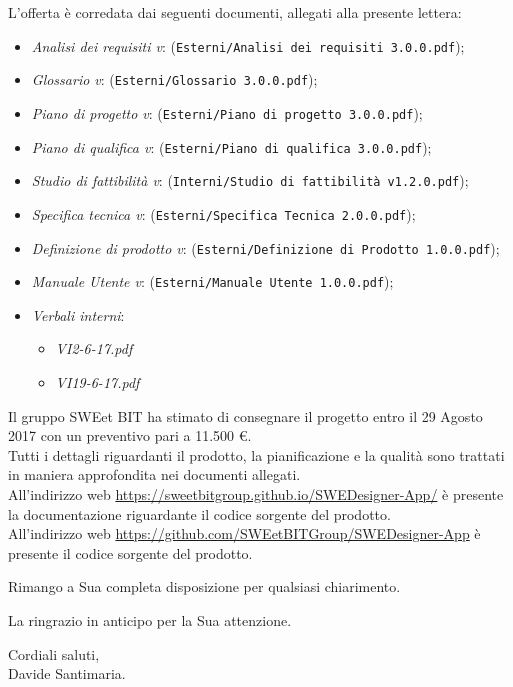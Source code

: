 	L'offerta è corredata dai seguenti documenti, allegati alla presente lettera:
	\begin{itemize}
		\item \emph{Analisi dei requisiti v\VersioneAR{}}: (\verb|Esterni/Analisi dei requisiti 3.0.0.pdf|);
		\item \emph{Glossario v\VersioneG{}}: (\verb|Esterni/Glossario 3.0.0.pdf|);
		\item \emph{Piano di progetto v\VersionePP{}}: (\verb|Esterni/Piano di progetto 3.0.0.pdf|);
		\item \emph{Piano di qualifica v\VersionePQ{}}: (\verb|Esterni/Piano di qualifica 3.0.0.pdf|);
		\item \emph{Studio di fattibilità v\VersioneSF{}}: (\verb|Interni/Studio di fattibilità v1.2.0.pdf|);
		\item \emph{Specifica tecnica v\VersioneST{}}: (\verb|Esterni/Specifica Tecnica 2.0.0.pdf|);
		\item \emph{Definizione di prodotto v\VersioneDP{}}: (\verb|Esterni/Definizione di Prodotto 1.0.0.pdf|);
		\item \emph{Manuale Utente v\VersioneMU{}}: (\verb|Esterni/Manuale Utente 1.0.0.pdf|);
		\item \emph{Verbali interni}:
		\begin{itemize}
			\item \emph{VI2-6-17.pdf}
			\item \emph{VI19-6-17.pdf}
		\end{itemize}
	\end{itemize}
	Il gruppo SWEet BIT ha stimato di consegnare il progetto entro il 29 Agosto 2017
	con un preventivo pari a 11.500 \euro .\\
	Tutti i dettagli riguardanti il prodotto, la pianificazione e la qualità sono trattati in maniera approfondita
	nei documenti allegati.\\
	All'indirizzo web \url{https://sweetbitgroup.github.io/SWEDesigner-App/} è presente la documentazione riguardante il codice sorgente del prodotto.\\
	All'indirizzo web \url{https://github.com/SWEetBITGroup/SWEDesigner-App} è presente il codice sorgente del prodotto.\\
	\begin{flushleft}
	\vspace{2cm}
		Rimango a Sua completa disposizione per qualsiasi chiarimento.
	\end{flushleft}
	\begin{flushleft}
		La ringrazio in anticipo per la Sua attenzione.
	\end{flushleft}
	\vspace{5mm}
	\begin{center}
		Cordiali saluti,\\
		\vspace{1cm}Davide Santimaria.
	\end{center}
